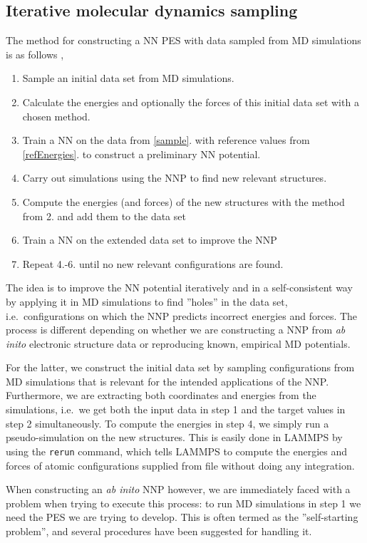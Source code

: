 \documentclass[twoside,english]{uiofysmaster}
\begin{document}
\subsection{Iterative molecular dynamics sampling} \label{sec:iterativeMDsampling}
The method for constructing a NN PES with data sampled from MD simulations is as follows \cite{Behler11general}
\cite{Raff12},
\begin{enumerate}
 \item Sample an initial data set from MD simulations. \label{sample} 
 \item Calculate the energies and optionally the forces of this initial data set with a chosen method. \label{refEnergies}
 \item Train a NN on the data from \ref{sample}. with reference values from \ref{refEnergies}. to
 construct a preliminary NN potential.
 \item Carry out simulations using the NNP to find new relevant structures. 
 \item Compute the energies (and forces) of the new structures with the method from 2. and add them to the data set
 \item Train a NN on the extended data set to improve the NNP
 \item Repeat 4.-6. until no new relevant configurations are found. 
  \label{NNPalgorithm}
\end{enumerate}
The idea is to improve the NN potential iteratively and in a self-consistent 
way by applying it in MD simulations to find 
''holes'' in the data set, i.e.\ configurations on which the NNP predicts incorrect energies and forces. The process
is different depending on whether we are constructing a NNP from \textit{ab inito} electronic structure data
or reproducing known, empirical MD potentials. 

For the latter, we construct the initial data set by sampling configurations from MD simulations that is relevant
for the intended applications of the NNP. Furthermore, we are extracting both coordinates and energies from the simulations, i.e.\
we get both the input data in step 1 and the target values in step 2 simultaneously. To compute the energies in
step 4, we simply run a pseudo-simulation on the new structures. This is easily done in LAMMPS by using 
the \texttt{rerun} command, which tells LAMMPS to compute the energies and forces of atomic configurations 
supplied from file without doing any integration. 

When constructing an \textit{ab inito} NNP however, we are immediately faced with a problem when trying to execute this process: 
to run MD simulations in step 1 we need the PES we are trying to develop. 
This is often termed as the ''self-starting problem'', 
and several procedures have been suggested for handling it. 
\end{document}
